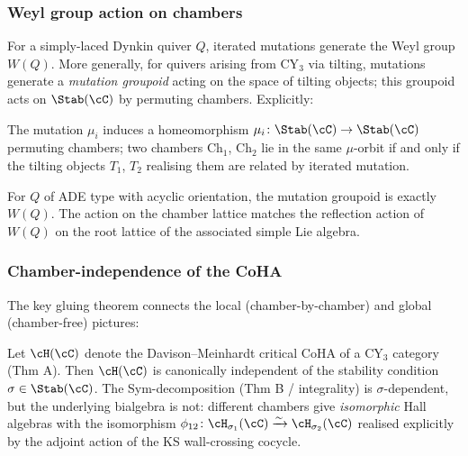 \subsubsection{Weyl group action on chambers}

For a simply-laced Dynkin quiver $Q$, iterated mutations generate the Weyl
group $W(Q)$. More generally, for quivers arising from CY$_3$ via tilting,
mutations generate a \emph{mutation groupoid} acting on the space of
tilting objects; this groupoid acts on $\Stab(\cC)$ by permuting chambers.
Explicitly:

\begin{proposition}
 \label{prop:mutation-on-chambers}
 The mutation $\mu_i$ induces a homeomorphism $\mu_i \colon \Stab(\cC) \to \Stab(\cC)$
 permuting chambers; two chambers $\mathrm{Ch}_1$, $\mathrm{Ch}_2$ lie in the same
 $\mu$-orbit if and only if the tilting objects $T_1$, $T_2$ realising them
 are related by iterated mutation.
\end{proposition}

\begin{corollary}
 \label{cor:weyl-chamber-action}
 For $Q$ of ADE type with acyclic orientation, the mutation groupoid is
 exactly $W(Q)$. The action on the chamber lattice matches the reflection
 action of $W(Q)$ on the root lattice of the associated simple Lie algebra.
\end{corollary}

\subsubsection{Chamber-independence of the CoHA}

The key gluing theorem connects the local (chamber-by-chamber) and
global (chamber-free) pictures:

\begin{theorem}
 \label{thm:coha-chamber-independent}
 Let $\cH(\cC)$ denote the Davison--Meinhardt critical CoHA of a CY$_3$
 category (Thm A). Then $\cH(\cC)$ is canonically independent of the
 stability condition $\sigma \in \Stab(\cC)$. The Sym-decomposition
 (Thm B / integrality) is $\sigma$-dependent, but the underlying bialgebra
 is not: different chambers give \emph{isomorphic} Hall algebras with the
 isomorphism $\phi_{12} \colon \cH_{\sigma_1}(\cC) \xrightarrow{\sim}
 \cH_{\sigma_2}(\cC)$ realised explicitly by the adjoint action of the
 KS wall-crossing cocycle.
\end{theorem}

